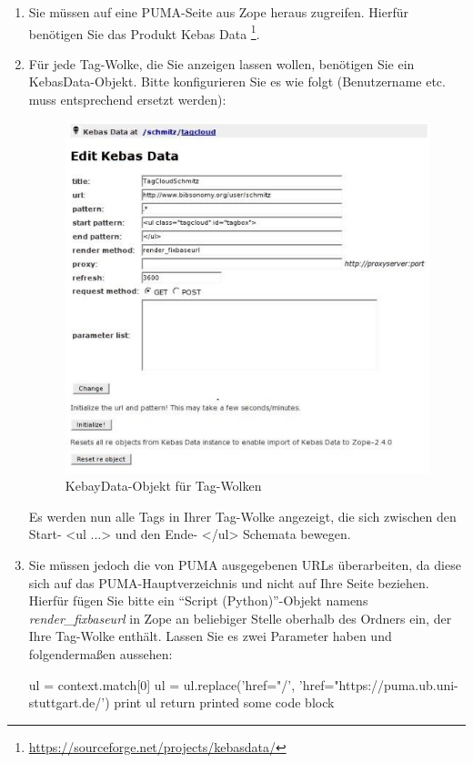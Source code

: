 \begin{enumerate}
    \item Sie müssen auf eine PUMA-Seite aus Zope heraus zugreifen. Hierfür benötigen Sie das Produkt Kebas Data \footnote{\url{https://sourceforge.net/projects/kebasdata/}}.
    \item Für jede Tag-Wolke, die Sie anzeigen lassen wollen, benötigen Sie ein KebasData-Objekt. Bitte konfigurieren Sie es wie folgt (Benutzername etc. muss entsprechend ersetzt werden):
  
\begin{figure}[h!]
 \centering
 \includegraphics[width=11cm]{Bilder/tag_wolken}
 \caption{KebayData-Objekt für Tag-Wolken}
 \label{fig:kebayDataObjekt}
\end{figure}

    Es werden nun alle Tags in Ihrer Tag-Wolke angezeigt, die sich zwischen den Start- <ul ...> und den Ende- </ul> Schemata bewegen.
    \item Sie müssen jedoch die von PUMA ausgegebenen URLs überarbeiten, da diese sich auf das PUMA-Hauptverzeichnis und nicht auf Ihre Seite beziehen. Hierfür fügen Sie bitte ein \enquote{Script (Python)}-Objekt namens \textit{render\_fixbaseurl} in Zope an beliebiger Stelle oberhalb des Ordners ein, der Ihre Tag-Wolke enthält. Lassen Sie es zwei Parameter haben und folgendermaßen aussehen: 

    ul = context.match[0]\newline
    ul = ul.replace('href="/', 'href="https://puma.ub.uni-stuttgart.de/')\newline
    print ul\newline
    return printed\newline
    some code block


\end{enumerate}
